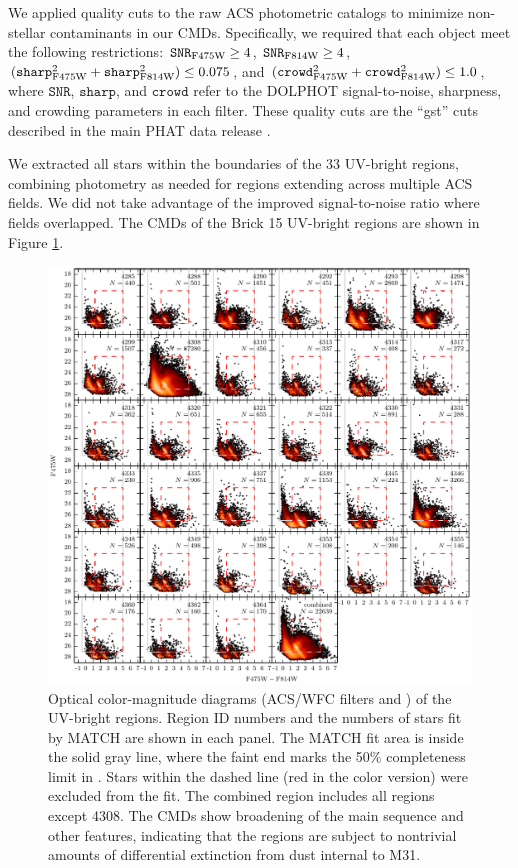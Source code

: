 We applied quality cuts to the raw ACS photometric catalogs to minimize
non-stellar contaminants in our CMDs. Specifically, we required that each
object meet the following restrictions: $\mathtt{SNR}_{\mathrm{F475W}} \ge 4$,
$\mathtt{SNR}_{\mathrm{F814W}} \ge 4$, $(\mathtt{sharp}_{\mathrm{F475W}}^2 + \mathtt{sharp}_{\mathrm{F814W}}^2)
\le 0.075$, and $(\mathtt{crowd}_{\mathrm{F475W}}^2 + \mathtt{crowd}_{\mathrm{F814W}}^2) \le 1.0$,
where $\mathtt{SNR}$, $\mathtt{sharp}$, and $\mathtt{crowd}$ refer to the
DOLPHOT signal-to-noise, sharpness, and crowding parameters in each filter.
These quality cuts are the ``gst'' cuts described in the main PHAT data release
\citep{Dalcanton:2012}.

We extracted all stars within the boundaries of the 33 UV-bright regions,
combining photometry as needed for regions extending across multiple ACS
fields. We did not take advantage of the improved signal-to-noise ratio where
fields overlapped. The CMDs of the Brick 15 UV-bright regions are shown in
Figure \ref{fig:uvr:cmd_grid}.


\begin{figure}
\centering
\includegraphics[width=\textwidth]{uv_regions-figures/cmd_grid.pdf}
\caption[Optical color-magnitude diagrams of the UV-bright regions.]{Optical
    color-magnitude diagrams (ACS/WFC filters \acsb{} and \acsi{}) of
    the UV-bright regions. Region ID numbers and the numbers of stars fit by
    MATCH are shown in each panel. The MATCH fit area is inside the solid gray
    line, where the faint end marks the 50\% completeness limit in \acsb{}. Stars
    within the dashed line (red in the color version) were excluded from the
    fit. The combined region includes all regions except 4308. The CMDs show
    broadening of the main sequence and other features, indicating that the
    regions are subject to nontrivial amounts of differential extinction from
    dust internal to M31.
}
\label{fig:uvr:cmd_grid}
\end{figure}



